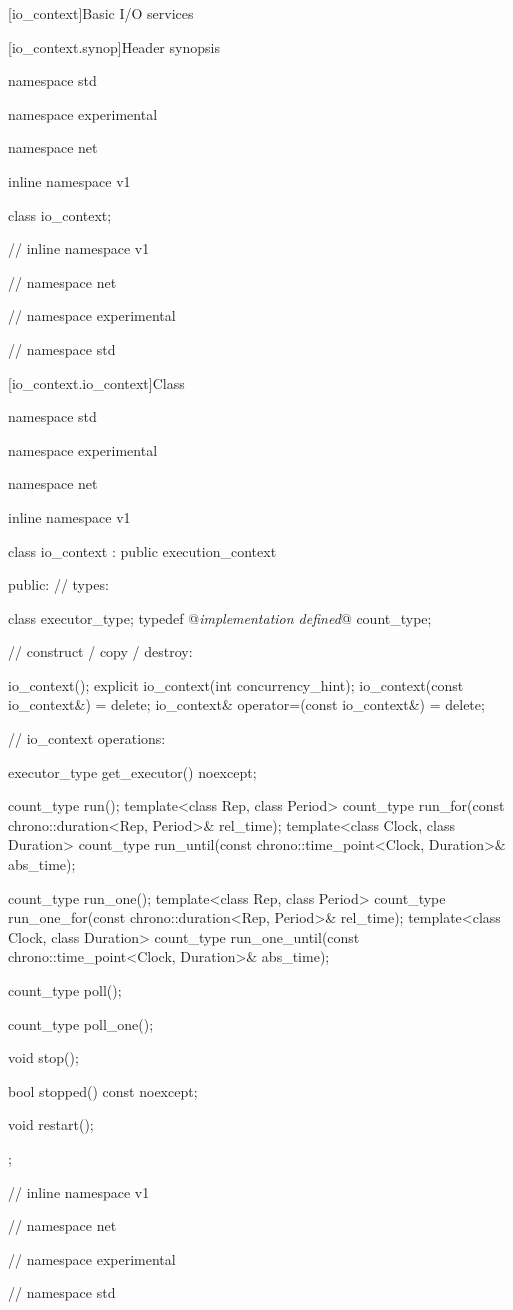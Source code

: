 
[io_context]{Basic I/O services}


[io_context.synop]{Header  synopsis}

\begin{codeblock}
namespace std {
namespace experimental {
namespace net {
inline namespace v1 {

  class io_context;

} // inline namespace v1
} // namespace net
} // namespace experimental
} // namespace std
\end{codeblock}



[io_context.io_context]{Class }

\begin{codeblock}
namespace std {
namespace experimental {
namespace net {
inline namespace v1 {

  class io_context : public execution_context
  {
  public:
    // types:

    class executor_type;
    typedef @\textit{implementation defined}@ count_type;

    // construct / copy / destroy:

    io_context();
    explicit io_context(int concurrency_hint);
    io_context(const io_context&) = delete;
    io_context& operator=(const io_context&) = delete;

    // io_context operations:

    executor_type get_executor() noexcept;

    count_type run();
    template<class Rep, class Period>
      count_type run_for(const chrono::duration<Rep, Period>& rel_time);
    template<class Clock, class Duration>
      count_type run_until(const chrono::time_point<Clock, Duration>& abs_time);

    count_type run_one();
    template<class Rep, class Period>
      count_type run_one_for(const chrono::duration<Rep, Period>& rel_time);
    template<class Clock, class Duration>
      count_type run_one_until(const chrono::time_point<Clock, Duration>& abs_time);

    count_type poll();

    count_type poll_one();

    void stop();

    bool stopped() const noexcept;

    void restart();
  };

} // inline namespace v1
} // namespace net
} // namespace experimental
} // namespace std
\end{codeblock}

